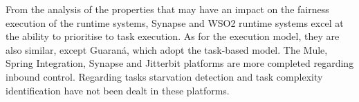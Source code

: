 From the analysis of the properties that may have an impact on the fairness execution of the runtime systems, Synapse and WSO2 runtime systems excel at the ability to prioritise to task execution. As for the execution model, they are also similar, except Guaraná, which adopt the task-based model. The Mule, Spring Integration, Synapse and Jitterbit platforms are more completed regarding inbound control. Regarding tasks starvation detection and task complexity identification have not been dealt in these platforms.
